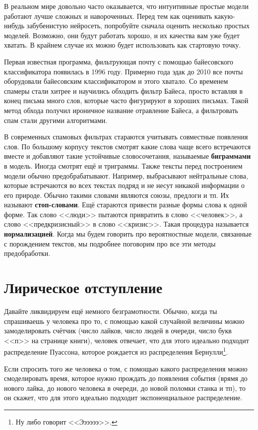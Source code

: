 \documentclass[12pt, a4paper, oneside]{extreport}
\newcommand{\indef}[1]{\textbf{#1}}     %
\theoremstyle{plain}              %
\theoremstyle{definition}         %
\begin{document}
В реальном мире довольно часто оказывается, что интуитивные простые модели работают лучше сложных и навороченных. Перед тем как оценивать какую-нибудь забубенистую нейросеть, попробуйте сначала оценить несколько простых моделей. Возможно, они будут работать хорошо, и их качества вам уже будет хватать. В крайнем случае их можно будет использовать как стартовую точку.  

Первая известная программа, фильтрующая почту с помощью байесовского классификатора появилась в 1996 году.  Примерно года эдак до 2010 все почты оборудовали байесовским классификатором и этого хватало.  Со временем спамеры стали хитрее и научились обходить фильтр Байеса, просто вставляя в конец письма много слов, которые часто фигурируют в хороших письмах. Такой метод обхода получил ироничное название отравление Байеса, а фильтровать спам стали другими алгоритмами. 

В современных спамовых фильтрах  стараются учитывать совместные появления слов.  По большому корпусу текстов смотрят какие слова чаще всего встречаются вместе и добавляют такие устойчивые словосочетания, называемые \indef{биграммами} в модель. Иногда смотрят ещё и триграммы. Также тексты перед построением модели обычно предобрабатывают. Например, выбрасывают нейтральные слова, которые встречаются во всех текстах подряд и не несут никакой информации о его природе.  Обычно такими словами являются союзы, предлоги и тп. Их называют \indef{стоп-словами}. Ещё стараются привести разные формы слова к одной форме. Так слово <<люди>> пытаются привратить в слово <<человек>>, а слово <<предкризисный>> в слово <<кризис>>. Такая процедура называется \indef{нормализацией}. Когда мы будем говорить про вероятностные модели, связанные с порождением текстов, мы подробнее поговорим про все эти методы предобработки. 


\section{Лирическое отступление}

Давайте ликвидируем ещё немного безграмотности. Обычно, когда ты спрашиваешь у человека про то, с помощью какой случайной величины можно замоделировать счётчик (число лайков, число людей в очереди, число букв <<п>> на странице книги), человек отвечает, что для этого идеально подходит распределение Пуассона, которое рождается из распределения Бернулли\footnote{Ну либо говорит <<Ээээээ>>.}. 

Если спросить того же человека о том, с помощью какого распределения можно смоделировать время, которое нужно прождать до появления события (врямя до нового лайка, до нового человека в очереди, до новой поломки станка и тп), то он скажет, что для этого идеально подходит экспоненциальное распределение. 
\end{document}
